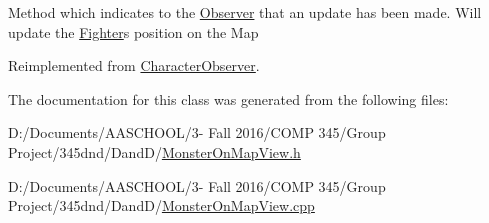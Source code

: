 Method which indicates to the \hyperlink{class_observer}{Observer} that an update has been made. Will update the \hyperlink{class_fighter}{Fighter}\textquotesingle{}s position on the Map 

Reimplemented from \hyperlink{class_character_observer_a398d6d784065c7ed36c928d44a574630}{Character\+Observer}.



The documentation for this class was generated from the following files\+:\begin{DoxyCompactItemize}
\item 
D\+:/\+Documents/\+A\+A\+S\+C\+H\+O\+O\+L/3-\/ Fall 2016/\+C\+O\+M\+P 345/\+Group Project/345dnd/\+Dand\+D/\hyperlink{_monster_on_map_view_8h}{Monster\+On\+Map\+View.\+h}\item 
D\+:/\+Documents/\+A\+A\+S\+C\+H\+O\+O\+L/3-\/ Fall 2016/\+C\+O\+M\+P 345/\+Group Project/345dnd/\+Dand\+D/\hyperlink{_monster_on_map_view_8cpp}{Monster\+On\+Map\+View.\+cpp}\end{DoxyCompactItemize}

